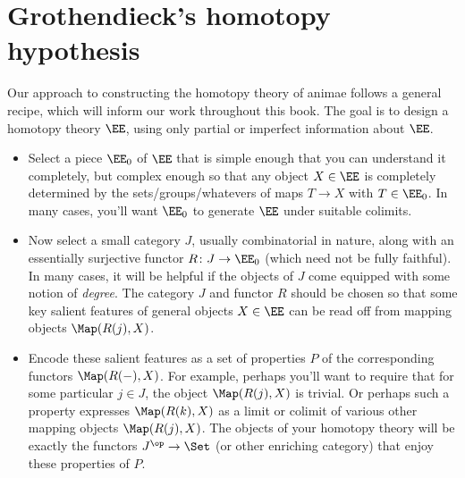 
\chapter{Grothendieck's homotopy hypothesis}%
\label{cha:Grothendieck's homotopy hypothesis}

Our approach to constructing the homotopy theory of animae follows a general recipe, which will inform our work throughout this book.
The goal is to design a homotopy theory $\EE$, using only partial or imperfect information about $\EE$.
\begin{itemize}
  \item%
    Select a piece $\EE_0$ of $\EE$ that is simple enough that you can understand it completely,
    but complex enough so that any object $X \in \EE$ is completely determined by the sets/groups/whatevers of maps $T \to X$ with $T \in \EE_0$.
    In many cases, you'll want $\EE_0$ to generate $\EE$ under suitable colimits.
  \item%
    Now select a small category $J$, usually combinatorial in nature,
    along with an essentially surjective functor $R \colon J \to \EE_0$ (which need not be fully faithful).
    In many cases, it will be helpful if the objects of $J$ come equipped with some notion of \emph{degree}.
    The category $J$ and functor $R$ should be chosen so that some key salient features of general objects $X \in \EE$ can be read off from mapping objects $\Map(R(j),X)$.
  \item%
    Encode these salient features as a set of properties $P$ of the corresponding functors $\Map(R(-),X)$.
    For example, perhaps you'll want to require that for some particular $j \in J$, the object $\Map(R(j),X)$ is trivial.
    Or perhaps such a property expresses $\Map(R(k),X)$ as a limit or colimit of various other mapping objects $\Map(R(j),X)$.
    The objects of your homotopy theory will be exactly the functors $J^{\op} \to \Set$ (or other enriching category) that enjoy these properties of $P$.
\end{itemize}

